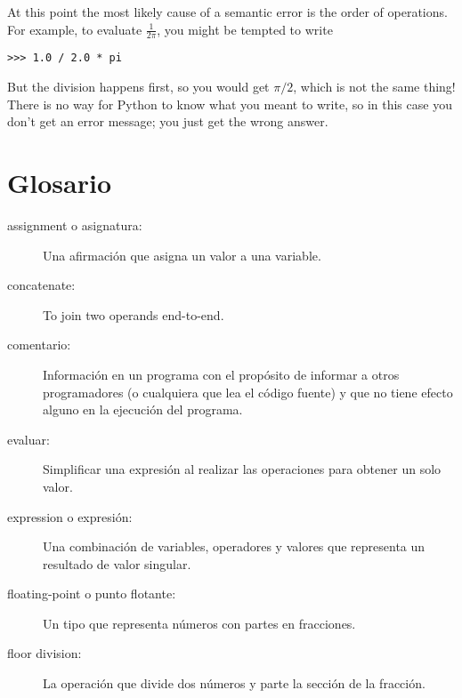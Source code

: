 \begin{ex}
At this point the most likely cause of a semantic error is
the order of operations.  For example, to evaluate $\frac{1}{2 \pi}$,
you might be tempted to write

\beforeverb
\begin{verbatim}
>>> 1.0 / 2.0 * pi
\end{verbatim}
\afterverb
%
But the division happens first, so you would get $\pi / 2$, which
is not the same thing!  There is no way for Python
to know what you meant to write, so in this case you don't
get an error message; you just get the wrong answer.




\section{Glosario}

\begin{description}

\item[assignment o asignatura:]  Una afirmaci\'on que asigna un valor a una variable.




\item[concatenate:]  To join two operands end-to-end.


\item[comentario:]  Informaci\'on en un programa con el prop\'osito de informar a otros programadores (o cualquiera que lea el c\'odigo fuente) y que no tiene efecto alguno en la ejecuci\'on del programa.

\item[evaluar:]  Simplificar una expresi\'on al realizar las operaciones para obtener un solo valor.

\item[expression o expresi\'on:]  Una combinaci\'on de variables, operadores y valores que
representa un resultado de valor singular.

\item[floating-point o punto flotante:] Un tipo que representa n\'umeros con partes en fracciones.

\item[floor division:] La operaci\'on que divide dos n\'umeros y parte la secci\'on de la fracci\'on.


\end{description}
\end{ex}
